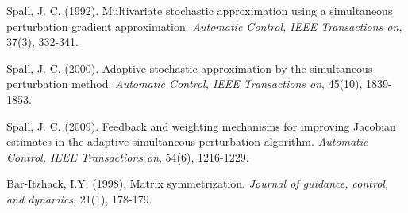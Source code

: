 \documentclass[conference]{IEEEtran}
\begin{document}
%
%
%
\begin{thebibliography}{1}

Spall, J. C. (1992). Multivariate stochastic approximation using a simultaneous perturbation gradient approximation. \textit{Automatic Control, IEEE Transactions on}, 37(3), 332-341.

Spall, J. C. (2000). Adaptive stochastic approximation by the simultaneous perturbation method. \textit{Automatic Control, IEEE Transactions on}, 45(10), 1839-1853.

Spall, J. C. (2009). Feedback and weighting mechanisms for improving Jacobian estimates in the adaptive simultaneous perturbation algorithm. \textit{Automatic Control, IEEE Transactions on}, 54(6), 1216-1229.

Bar-Itzhack, I.Y. (1998). Matrix symmetrization. \textit{Journal of guidance, control, and dynamics}, 21(1), 178-179.

\end{thebibliography}




\end{document}
